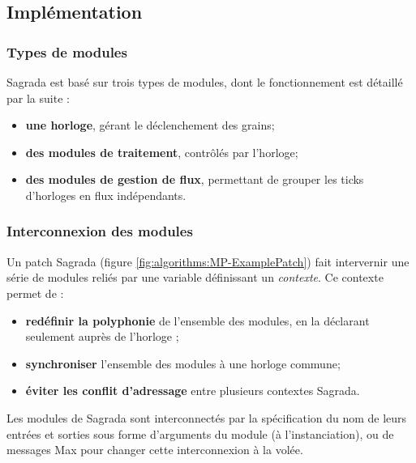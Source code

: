 \subsection{Implémentation}

\subsubsection{Types de modules}
\noindent Sagrada est basé sur trois types de modules, dont le fonctionnement est détaillé par la suite :
\vspace{-1em}
\begin{itemize}[noitemsep]
	\item \textbf{une horloge}, gérant le déclenchement des grains;
	\item \textbf{des modules de traitement}, contrôlés par l'horloge;
	\item \textbf{des modules de gestion de flux}, permettant de grouper les ticks d'horloges en flux indépendants.
\end{itemize}


\subsubsection{Interconnexion des modules}

\noindent Un patch Sagrada (figure \ref{fig:algorithms:MP-ExamplePatch}) fait intervernir une série de modules reliés par une variable définissant un \textit{contexte}. Ce contexte permet de :
\vspace{-1em}
\begin{itemize}[noitemsep]
	\item \textbf{redéfinir la polyphonie} de l'ensemble des modules, en la déclarant seulement auprès de l'horloge ;
	\item \textbf{synchroniser} l'ensemble des modules à une horloge commune;
	\item \textbf{éviter les conflit d'adressage} entre plusieurs contextes Sagrada.
\end{itemize}

\noindent Les modules de Sagrada sont interconnectés par la spécification du nom de leurs entrées et sorties sous forme d'arguments du module (à l'instanciation), ou de messages Max pour changer cette interconnexion à la volée.

